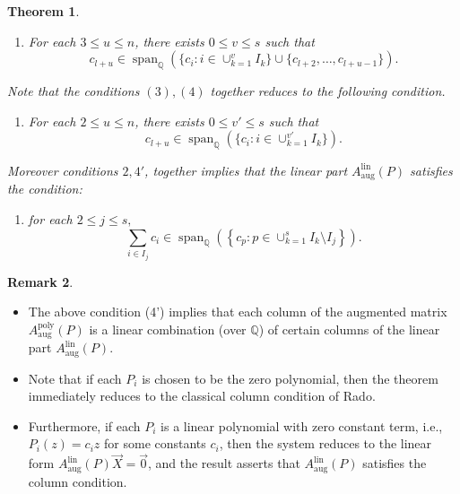 \documentclass{article}
\theoremstyle{Theorem}
\newtheorem{thm}{Theorem}[section]
\theoremstyle{definition}
\newtheorem{rem}[thm]{Remark}
\begin{document}
\begin{thm}
\begin{enumerate}
    \item For each \( 3 \leq u \leq n \), there exists \( 0 \leq v \leq s \) such that
    \[
    c_{l+u} \in \operatorname{span}_{\mathbb{Q}} \left( \{ c_i : i\in \cup_{k=1}^{v}I_k \} \cup \{ c_{l+2}, \ldots, c_{l+u-1} \} \right).
    \]
\end{enumerate}

Note that the conditions $(3),(4)$ together reduces to the following condition.
\begin{enumerate}
    \item[(4')] For each \( 2 \leq u \leq n \), there exists \( 0 \leq v' \leq s \) such that
    \[
    c_{l+u} \in \operatorname{span}_{\mathbb{Q}} \left( \{ c_i : i\in \cup_{k=1}^{v'}I_k \}  \right).
    \]
\end{enumerate}

Moreover conditions $2,4'$, together implies that the linear part \( A_{\text{aug}}^{\text{lin}}(P) \) satisfies the condition:

   \begin{enumerate}
       \item[(2')] for each $2\leq j\leq s,$ \[
  \sum_{i\in I_j}c_i   \in \operatorname{span}_{\mathbb{Q}} \left( \left\lbrace c_p : p \in \cup_{k=1}^{s}I_k\setminus I_j \right\rbrace \right).
    \]
     \end{enumerate}
\end{thm}


\begin{rem}\text{}
    
\begin{itemize}
    \item The above condition (4') implies that each column of the augmented matrix \( A_{\text{aug}}^{\text{poly}}(P) \) is a linear combination (over \( \mathbb{Q} \)) of certain columns of the linear part \( A_{\text{aug}}^{\text{lin}}(P) \).
   
    
    
    \item Note that if each \( P_i \) is chosen to be the zero polynomial, then the theorem immediately reduces to the classical column condition of Rado.
    
    \item  Furthermore, if each \( P_i \) is a linear polynomial with zero constant term, i.e., \( P_i(z) = c_i z \) for some constants \( c_i \), then the system reduces to the linear form \( A_{\text{aug}}^{\text{lin}}(P)\vec{X} = \vec{0} \), and the result asserts that \( A_{\text{aug}}^{\text{lin}}(P) \) satisfies the column condition.

\end{itemize}
\end{rem}
\end{document}
